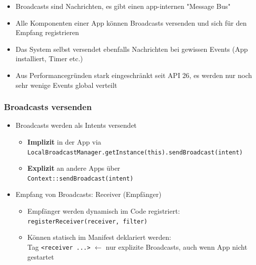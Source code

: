 \documentclass[a4paper]{article}
\begin{document}
	\begin{itemize}
		\item Broadcasts sind Nachrichten, es gibt einen app-internen "Message Bus"
		
		\item Alle Komponenten einer App können Broadcasts versenden und sich für den Empfang registrieren
		
		\item Das System selbst versendet ebenfalls Nachrichten bei gewissen Events (App installiert, Timer etc.)
		
		\item Aus Performancegründen stark eingeschränkt seit API 26, es werden nur noch sehr wenige Events global verteilt 
	\end{itemize}

		\subsubsection{Broadcasts versenden}
		
		\begin{itemize}
			
			\item Broadcasts werden als Intents versendet
			\begin{itemize}
				\item \textbf{Implizit} in der App via \\
				 \texttt{LocalBroadcastManager.getInstance(this).sendBroadcast(intent)}
				 
				 \item \textbf{Explizit} an andere Apps über \\
				 \texttt{Context::sendBroadcast(intent)}
			\end{itemize}
			
			\item Empfang von Broadcasts: Receiver (Empfänger)
			\begin{itemize}
				\item Empfänger werden dynamisch im Code registriert:\\
				\texttt{registerReceiver(receiver, filter)}
				
				\item Können statisch im Manifest deklariert werden:\\
				Tag \texttt{<receiver ...>} $\leftarrow$ nur explizite Broadcasts, auch wenn App nicht gestartet
			\end{itemize}
			
		\end{itemize}
\end{document}
